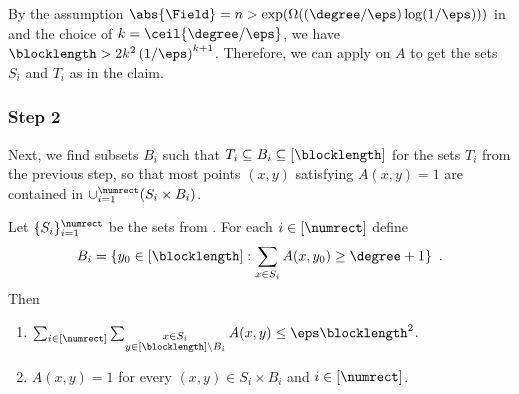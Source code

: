 \documentclass{toc}
\theoremstyle{plain}
\begin{document}
    By the assumption $\abs{\Field} = n > \exp(\Omega(({\degree}/{\eps}) \log({1}/{\eps})))$
    in  and the choice of $k = \ceil{\degree/\eps}$, we have $\blocklength > 2k^2 \left({1}/{\eps}\right)^{k+1}$.
    Therefore, we can apply  on
 $A$ to get
%
the sets $S_i$ and $T_i$  %
    as in the claim.

 \subsubsection{Step 2}

    Next, we find subsets $B_i$ such that  $T_i \subseteq B_i \subseteq [\blocklength]$ for %
%
the sets $T_i$                  %
from the previous step, so that most points $(x,y)$ satisfying $A(x,y) = 1$ are contained in $\cup_{i=1}^{\numrect} (S_i \times B_i)$.
    \begin{claim}\label{claim:Si-Ti box}
        Let $\{S_i\}_{i=1}^{\numrect}$ be the sets from .
        For each $i \in [\numrect]$ define
        \[
          B_i = \{ y_0 \in [\blocklength] : \sum_{x \in S_i} A(x,y_0) \geq \degree+1\}\enspace.
          \]
        Then
        \begin{enumerate}
        \item
            $\sum_{i \in [\numrect]} \sum_{\substack{x \in S_i \\ y \in [\blocklength] \setminus B_i}} A(x,y) \leq \eps \blocklength^2$.
        \item
            $A(x,y)=1$ for every $(x,y) \in S_i \times B_i$ and $i \in [\numrect]$.
    \end{enumerate}
    \end{claim}
\end{document}
